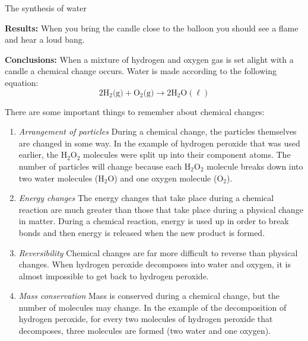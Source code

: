 \begin{g_experiment}{The synthesis of water}
\begin{enumerate}[noitemsep, label=\textbf{\arabic*}. ]
\end{enumerate}
        \par 
        \label{m38709*id63254}\noindent{}\textbf{Results:}\newline
When you bring the candle close to the balloon you should see a flame and hear a loud bang.\par 
        \label{m38709*id63302}\noindent{}\textbf{Conclusions:}\newline
When a mixture of hydrogen and oxygen gas is set alight with a candle a chemical change occurs. Water is made according to the following equation:
        \label{m38709*id63313}\nopagebreak\noindent{}
    \begin{equation*}
    2{\text{H}}_{2} \text{(g)} + {\text{O}}_{2}\text{(g)} \to 2\text{H}_{2}\text{O}(\ell)
      \end{equation*}   
\end{g_experiment}
      \label{m38709*id62865}There are some important things to remember about chemical changes:
      \label{m38709*id62869}\begin{enumerate}[noitemsep, label=\textbf{\arabic*}. ] 
\item \textsl{Arrangement of particles}\newline
During a chemical change, the particles themselves are changed in some way. In the example of hydrogen peroxide that was used earlier, the $\text{H}_{2}\text{O}_{2}$ molecules were split up into their component atoms. The number of particles will change because each $\text{H}_{2}\text{O}_{2}$ molecule breaks down into two water molecules ($\text{H}_{2}\text{O}$) and one oxygen molecule ($\text{O}_{2}$).
\item \textsl{Energy changes}\newline
The energy changes that take place during a chemical reaction are much greater than those that take place during a physical change in matter. During a chemical reaction, energy is used up in order to break bonds and then energy is released when the new product is formed. 
\item \textsl{Reversibility}\newline
Chemical changes are far more difficult to reverse than physical changes. When hydrogen peroxide decomposes into water and oxygen, it is almost impossible to get back to hydrogen peroxide.
\item \textsl{Mass conservation}\newline
Mass is conserved during a chemical change, but the number of molecules may change. In the example of the decomposition of hydrogen peroxide, for every two molecules of hydrogen peroxide that decomposes, three molecules are formed (two water and one oxygen).
\end{enumerate}
